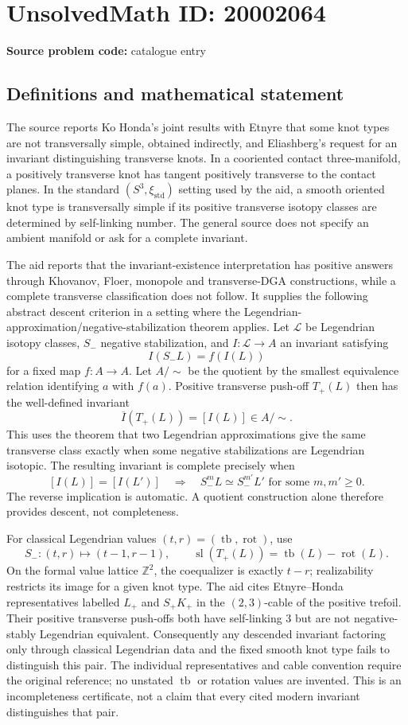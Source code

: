 \documentclass[11pt]{article}
\newcommand{\Z}{\mathbb{Z}}
\begin{document}
\section*{UnsolvedMath ID: 20002064}
\textbf{Source problem code:} catalogue entry
\subsection{Definitions and mathematical statement}
The source reports Ko Honda's joint results with Etnyre that some knot types are not transversally simple, obtained indirectly, and Eliashberg's request for an invariant distinguishing transverse knots. In a cooriented contact three-manifold, a positively transverse knot has tangent positively transverse to the contact planes. In the standard \((S^3,\xi_{\mathrm{std}})\) setting used by the aid, a smooth oriented knot type is transversally simple if its positive transverse isotopy classes are determined by self-linking number. The general source does not specify an ambient manifold or ask for a complete invariant.

The aid reports that the invariant-existence interpretation has positive answers through Khovanov, Floer, monopole and transverse-DGA constructions, while a complete transverse classification does not follow. It supplies the following abstract descent criterion in a setting where the Legendrian-approximation/negative-stabilization theorem applies. Let \(\mathcal L\) be Legendrian isotopy classes, \(S_-\) negative stabilization, and \(I:\mathcal L\to A\) an invariant satisfying
\[
 I(S_-L)=f(I(L))
\]
for a fixed map \(f:A\to A\). Let \(A/{\sim}\) be the quotient by the smallest equivalence relation identifying \(a\) with \(f(a)\). Positive transverse push-off \(T_+(L)\) then has the well-defined invariant
\[
 \overline I(T_+(L))=[I(L)]\in A/{\sim}.
\]
This uses the theorem that two Legendrian approximations give the same transverse class exactly when some negative stabilizations are Legendrian isotopic. The resulting invariant is complete precisely when
\[
 [I(L)]=[I(L')]
 \quad\Longrightarrow\quad
 S_-^mL\simeq S_-^{m'}L'
 \text{ for some }m,m'\geq0.
\]
The reverse implication is automatic. A quotient construction alone therefore provides descent, not completeness.

For classical Legendrian values \((t,r)=(\operatorname{tb},\operatorname{rot})\), use
\[
 S_-:(t,r)\mapsto(t-1,r-1),\qquad
 \operatorname{sl}(T_+(L))=\operatorname{tb}(L)-\operatorname{rot}(L).
\]
On the formal value lattice \(\Z^2\), the coequalizer is exactly \(t-r\); realizability restricts its image for a given knot type. The aid cites Etnyre--Honda representatives labelled \(L_+\) and \(S_+K_+\) in the \((2,3)\)-cable of the positive trefoil. Their positive transverse push-offs both have self-linking \(3\) but are not negative-stably Legendrian equivalent. Consequently any descended invariant factoring only through classical Legendrian data and the fixed smooth knot type fails to distinguish this pair. The individual representatives and cable convention require the original reference; no unstated \(\operatorname{tb}\) or rotation values are invented. This is an incompleteness certificate, not a claim that every cited modern invariant distinguishes that pair.
\end{document}
